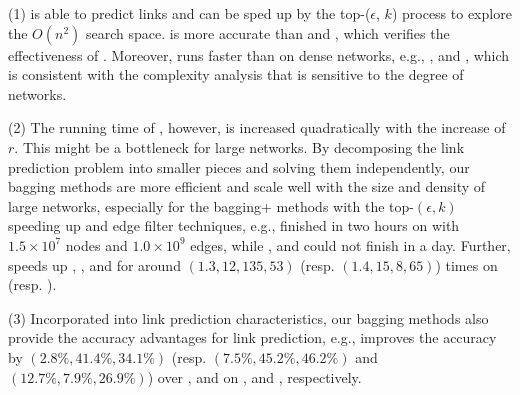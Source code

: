 \sstab (1) \NMF is able to predict links and can be sped up
by the top-($\epsilon$, $k$) process to explore the $O(n^2)$ search space. \NMF is
more accurate than \Aa and \BIGCLAM, which verifies the effectiveness
of \NMF. Moreover, \NMF runs faster than \BIGCLAM on dense networks,
e.g., \Wikipedia, \Twitter and \Friendster, which is consistent with the complexity analysis
that \BIGCLAM is sensitive to the degree of networks. 

\sstab (2) The running time of
\NMF, however, is increased quadratically with the increase of $r$. This might be a bottleneck
for large networks. By decomposing the link prediction problem into smaller pieces
and solving them independently, our bagging methods are more efficient and
scale well with the size and density of large networks, especially for the bagging+
methods with the top-$(\epsilon, k)$ speeding up and edge filter techniques,
e.g., \Biasedp finished in two hours on \Friendster with $1.5\times 10^7$ nodes and
$1.0\times 10^9$ edges, while \NMF, \Aa  and \BIGCLAM could not finish in a day.
Further, \Biasedp speeds up \Biased, \NMF, \Aa and \BIGCLAM
for around $(1.3, 12, 135, 53)$ (resp. $(1.4, 15, 8, 65)$) times on \Twitter (resp. \Friendster).

\sstab (3) Incorporated into link prediction characteristics, our
bagging methods also provide the accuracy advantages for link prediction,
e.g., \Biased improves the accuracy by
$(2.8\%, 41.4\%, 34.1\%)$ (resp. $(7.5\%, 45.2\%, 46.2\%)$ and $(12.7\%, 7.9\%, 26.9\%)$)
over \NMF, \Aa and \BIGCLAM on \Digg, \YouTube and \Wikipedia, respectively.













%
%
%
%
%
%


